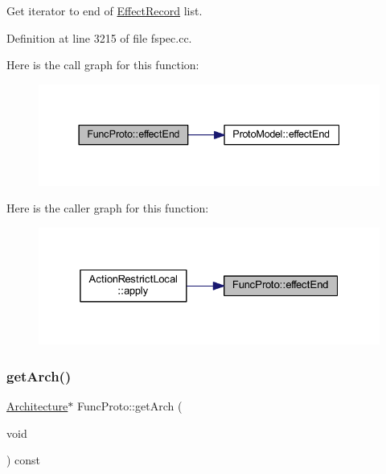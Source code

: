 Get iterator to end of \mbox{\hyperlink{class_effect_record}{Effect\+Record}} list. 



Definition at line 3215 of file fspec.\+cc.

Here is the call graph for this function\+:
\nopagebreak
\begin{figure}[H]
\begin{center}
\leavevmode
\includegraphics[width=337pt]{class_func_proto_a75adeed5dd962662f85c69b6104a8d07_cgraph}
\end{center}
\end{figure}
Here is the caller graph for this function\+:
\nopagebreak
\begin{figure}[H]
\begin{center}
\leavevmode
\includegraphics[width=325pt]{class_func_proto_a75adeed5dd962662f85c69b6104a8d07_icgraph}
\end{center}
\end{figure}
\mbox{\label{class_func_proto_ac21659d866e78bb27aca67f1cb2df390}} 
\subsubsection{\texorpdfstring{getArch()}{getArch()}}
{\footnotesize\ttfamily \mbox{\hyperlink{class_architecture}{Architecture}}$\ast$ Func\+Proto\+::get\+Arch (\begin{DoxyParamCaption}\item[{void}]{ }\end{DoxyParamCaption}) const\hspace{0.3cm}{\ttfamily [inline]}}



